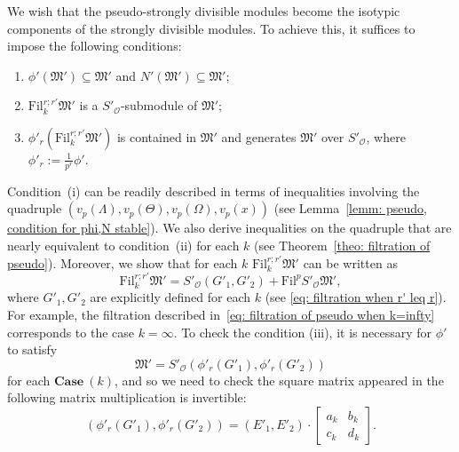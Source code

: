 \documentclass[11pt]{amsart}
\theoremstyle{definition}
\numberwithin{equation}{subsection}
\theoremstyle{plain}
\theoremstyle{plain}
\theoremstyle{plain}
\theoremstyle{plain}
\theoremstyle{plain}
\theoremstyle{plain}
\theoremstyle{plain}
\theoremstyle{plain}
\theoremstyle{plain}
\theoremstyle{plain}
\theoremstyle{plain}
\theoremstyle{plain}
\theoremstyle{definition}
\theoremstyle{definition}
\theoremstyle{definition}
\theoremstyle{remark}
\renewcommand{\(}{\textup{(}}
\renewcommand{\)}{\textup{)}}
\newcommand{\fM}{\mathfrak{M}}
\newcommand{\Fil}{\mathrm{Fil}}
\newcommand{\cO}{\mathcal{O}}
\begin{document}
We wish that the pseudo-strongly divisible modules become the isotypic components of the strongly divisible modules. To achieve this, it suffices to impose the following conditions: 
\begin{enumerate}[leftmargin=*]
\item $\phi'(\fM')\subseteq\fM'$ and $N'(\fM')\subseteq\fM'$;
\item $\Fil^{r;r'}_k\fM'$ is a $S'_\cO$-submodule of $\fM'$;
\item $\phi'_r(\Fil^{r;r'}_k\fM')$ is contained in $\fM'$ and generates $\fM'$ over $S'_\cO$, where $\phi'_r:=\tfrac{1}{p^r}\phi'$.
\end{enumerate}
Condition~(i) can be readily described in terms of inequalities involving the quadruple $(v_p(\Lambda), v_p(\Theta), v_p(\Omega), v_p(x))$ (see Lemma~\ref{lemm: pseudo, condition for phi,N stable}). We also derive inequalities on the quadruple that are nearly equivalent to condition~(ii) for each $k$ (see Theorem~\ref{theo: filtration of pseudo}). Moreover, we show that for each $k$ $\Fil^{r;r'}_k\fM'$ can be written as
$$\Fil^{r;r'}_k\fM'=S'_\cO(G'_1,G'_2)+\Fil^pS'_\cO\fM',$$ 
where $G'_1,G'_2$ are explicitly defined for each $k$ (see \eqref{eq: filtration when r' leq r}).  For example, the filtration described in~\eqref{eq: filtration of pseudo when k=infty} corresponds to the case $k=\infty$. To check the condition (iii),  it is necessary for $\phi'$ to satisfy
\begin{equation}\label{eq: strong divisibility, intro}
\fM'=S'_\cO\left(\phi'_r(G'_1),\phi'_r(G'_2)\right)
\end{equation} 
for each $\mathbf{Case}~(k)$, and so we need to check the square matrix appeared in the following matrix multiplication is invertible:
$$(\phi'_r(G'_1),\phi'_r(G'_2))=(E'_1,E'_2)\cdot
\begin{bmatrix}
  a_k & b_k \\
  c_k & d_k 
\end{bmatrix}.$$
\end{document}
